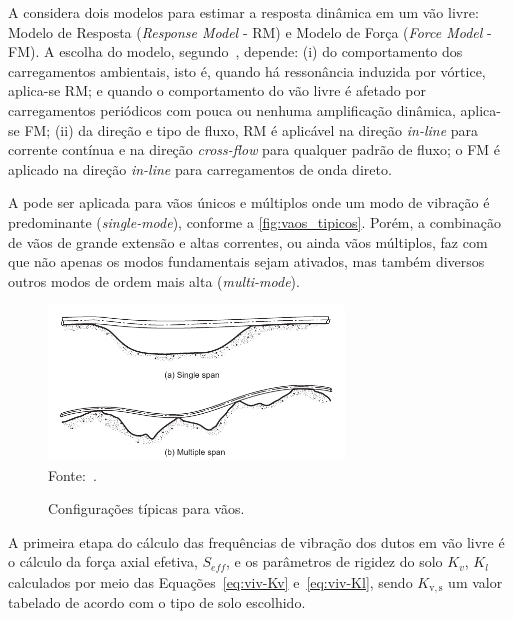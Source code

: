 A  considera dois modelos para estimar a resposta dinâmica em um vão livre: Modelo de Resposta (\textit{Response Model} - RM) e Modelo de Força (\textit{Force Model} - FM).
A escolha do modelo, segundo~, depende: (i) do comportamento dos carregamentos ambientais, isto é, quando há ressonância induzida por vórtice, aplica-se RM; e quando o comportamento do vão livre é afetado por carregamentos periódicos com pouca ou nenhuma amplificação dinâmica, aplica-se FM; (ii) da direção e tipo de fluxo, RM é aplicável na direção \textit{in-line} para corrente contínua e na direção \textit{cross-flow} para qualquer padrão de fluxo; o FM é aplicado na direção \textit{in-line} para carregamentos de onda direto.

A  pode ser aplicada para vãos únicos e múltiplos onde um modo de vibração é predominante (\textit{single-mode}), conforme a \autoref{fig:vaos_tipicos}.
Porém, a combinação de vãos de grande extensão e altas correntes, ou ainda vãos múltiplos, faz com que não apenas os modos fundamentais sejam ativados, mas também diversos outros modos de ordem mais alta (\textit{multi-mode}).

\begin{figure}[!ht]
	\centering
    \caption{Configurações típicas para vãos.}\label{fig:vaos_tipicos}
	\includegraphics[width=0.7\textwidth]{imagens/vaos_tipicos}
    \\Fonte:~.
\end{figure}

A primeira etapa do cálculo das frequências de vibração dos dutos em vão livre é o cálculo da força axial efetiva, $S_\mathit{eff}$, e os parâmetros de rigidez do solo $K_v$, $K_l$ calculados por meio das Equações~\ref{eq:viv-Kv} e~\ref{eq:viv-Kl}, sendo $K_\mathrm{v,s}$ um valor tabelado de acordo com o tipo de solo escolhido.


